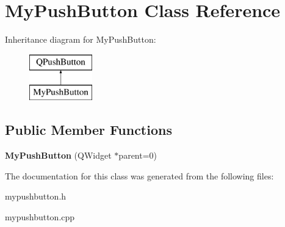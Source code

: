 \hypertarget{class_my_push_button}{\section{My\-Push\-Button Class Reference}
\label{class_my_push_button}
}
Inheritance diagram for My\-Push\-Button\-:\begin{figure}[H]
\begin{center}
\leavevmode
\includegraphics[height=2.000000cm]{class_my_push_button}
\end{center}
\end{figure}
\subsection*{Public Member Functions}
\begin{DoxyCompactItemize}
\item 
\hypertarget{class_my_push_button_aaebc58414627c35d593eec6912957020}{{\bfseries My\-Push\-Button} (Q\-Widget $\ast$parent=0)}\label{class_my_push_button_aaebc58414627c35d593eec6912957020}

\end{DoxyCompactItemize}


The documentation for this class was generated from the following files\-:\begin{DoxyCompactItemize}
\item 
mypushbutton.\-h\item 
mypushbutton.\-cpp\end{DoxyCompactItemize}
